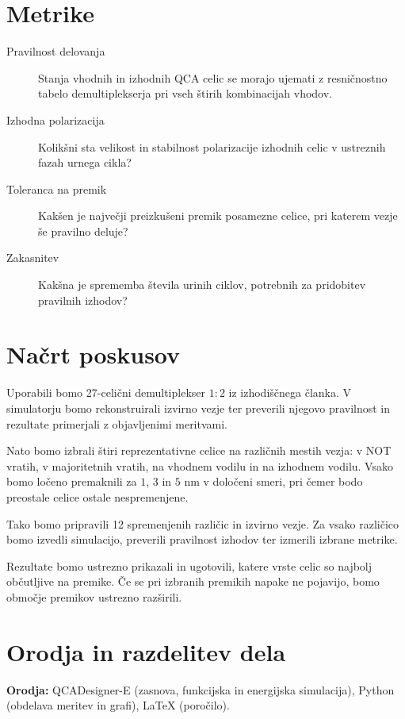 \documentclass[10pt,a4paper]{article}
\begin{document}
\section*{Metrike}
\begin{description}
    \item[Pravilnost delovanja] Stanja vhodnih in izhodnih QCA celic se morajo ujemati z resničnostno tabelo demultiplekserja pri vseh štirih kombinacijah vhodov.
    \item [Izhodna polarizacija] Kolikšni sta velikost in stabilnost polarizacije izhodnih celic v ustreznih fazah urnega cikla?
    \item[Toleranca na premik] Kakšen je največji preizkušeni premik posamezne celice, pri katerem vezje še pravilno deluje?
    \item[Zakasnitev] Kakšna je sprememba števila urinih ciklov, potrebnih za pridobitev pravilnih izhodov?
\end{description}

\section*{Načrt poskusov}

Uporabili bomo 27-celični demultiplekser $1:2$ iz izhodiščnega članka. V simulatorju bomo rekonstruirali izvirno vezje ter preverili njegovo pravilnost in rezultate primerjali z objavljenimi meritvami.

Nato bomo izbrali štiri reprezentativne celice na različnih mestih vezja: v NOT vratih, v majoritetnih vratih, na vhodnem vodilu in na izhodnem vodilu. Vsako bomo ločeno premaknili za $1$, $3$ in $5$ nm v določeni smeri, pri čemer bodo preostale celice ostale nespremenjene.

Tako bomo pripravili 12 spremenjenih različic in izvirno vezje. Za vsako različico bomo izvedli simulacijo, preverili pravilnost izhodov ter izmerili izbrane metrike.

Rezultate bomo ustrezno prikazali in ugotovili, katere vrste celic so najbolj občutljive na premike. Če se pri izbranih premikih napake ne pojavijo, bomo območje premikov ustrezno razširili.

\section*{Orodja in razdelitev dela}

\textbf{Orodja:} QCADesigner-E (zasnova, funkcijska in energijska simulacija), Python (obdelava meritev in grafi), \LaTeX{} (poročilo).
\end{document}
